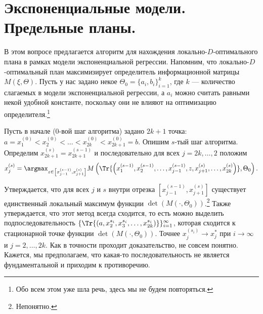 \section{Экспоненциальные модели. Предельные планы.}

В этом вопросе предлагается алгоритм для нахождения локально-$D$-оптимального плана в рамках модели экспоненциальной регрессии.
Напомним, что локально-$D$-оптимальный план максимизирует определитель информационной матрицы $M(\xi, \Theta)$.
Пусть у нас задано некое $\Theta_0 = \{a_i, b_i\}_{i=1}^k$, где $k$ --- количество слагаемых в модели экспоненциальной регрессии, а $a_i$ можно считать равными некой удобной константе,
поскольку они не влияют на оптимизацию определителя.\footnote{Обо всем этом уже шла речь, здесь мы не будем повторяться.}

Пусть в начале ($0$-вой шаг алгоритма) задано $2k + 1$ точка: $a = x_1^{(0)} < x_2^{(0)} < \ldots < x_{2k}^{(0)} < x_{2k + 1}^{(0)} = b$.
Опишим $s$-тый шаг алгоритма.
Определим $x_{2k + 1}^{(s)} = x_{2k + 1}^{(s-1)}$ и последовательно для всех $j = 2k, \ldots, 2$ положим
$$x_{j}^{(s)} = \argmax_{z \in \left[x_{j - 1}^{(s-1)}, x_{j+1}^{(s)}\right]} M\left(\Tr{\left(x_1^{(s-1)}, x_2^{(s-1)}, \ldots, x_{j - 1}^{(s-1)}, z, x_{j + 1}^{(s)}, \ldots, x_{2k}^{(s)}\right)}, \Theta_0\right).$$

Утверждается, что для всех $j$ и $s$ внутри отрезка $\left[x_{j - 1}^{(s-1)}, x_{j+1}^{(s)}\right]$ существует единственный локальный максимум функции $\det(M(\cdot, \Theta_0))$.\footnote{\color{blue} Непонятно.}
Также утверждается, что этот метод всегда сходится, то есть можно выделить подпоследовательность $\{ \Tr{(a, x_2^{s_i}, x_3^{s_i}, \ldots, x_{2k}^{s_i})} \}_{i = 1}^\infty$, которая сходится к
стационарной точке функции $\det(M(\cdot, \Theta_0))$. Точнее $x_j^{(s_i)} \to x_j^*$ при $i \to \infty$ и $j = 2, \ldots, 2k$.
{\color{blue} Как в точности проходит доказательство, не совсем понятно. Кажется, мы предполагаем, что какая-то последовательность не является фундаментальной и приходим к противоречию.}
